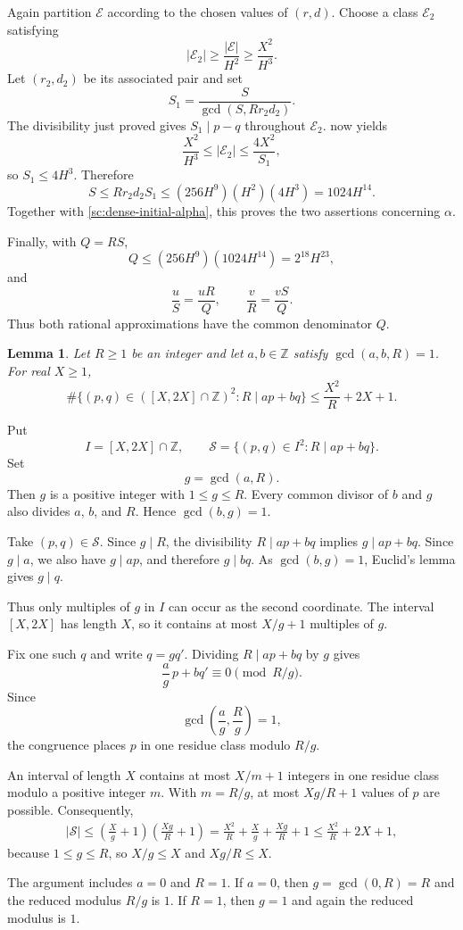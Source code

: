\documentclass[twoside]{aomart}
\makeatletter
\theoremstyle{paperplain}
\newtheorem{lemma}[theorem]{Lemma}
\theoremstyle{paperdefinition}
\renewenvironment{proof}[1][\proofname]{\par\pushQED{\qed}%
  \normalfont\topsep6\p@\@plus3\p@\relax\trivlist
  \item[\hskip\labelsep\itshape #1\@addpunct{.}]\ignorespaces
}{\popQED\endtrivlist\@endpefalse}
\numberwithin{equation}{section}
\makeatother
\begin{document}
\begin{proof}
Again partition $\mathcal E$ according to the chosen values of $(r,d)$.
Choose a class $\mathcal E_2$ satisfying
$$|\mathcal E_2|\ge\frac{|\mathcal E|}{H^2}\ge\frac{X^2}{H^3}.$$
Let $(r_2,d_2)$ be its associated pair and set
\[
 S_1=\frac{S}{\gcd(S,Rr_2d_2)}.
\]
The divisibility just proved gives
$S_1\mid p-q$ throughout $\mathcal E_2$.  now yields
\[
 \frac{X^2}{H^3}
 \le |\mathcal E_2|
 \le \frac{4X^2}{S_1},
\]
so $S_1\le4H^3$. Therefore
\[
 S\le Rr_2d_2S_1
 \le (256H^9)(H^2)(4H^3)
 =1024H^{14}.
\]
Together with \eqref{sc:dense-initial-alpha}, this proves the two
assertions concerning $\alpha$.

Finally, with $Q=RS$,
\[
 Q\le(256H^9)(1024H^{14})=2^{18}H^{23},
\]
and
\[
 \frac uS=\frac{uR}{Q},
 \qquad
 \frac vR=\frac{vS}{Q}.
\]
Thus both rational approximations have the common denominator $Q$.
\end{proof}

\begin{lemma}\label{sc:primitive-congruence}
Let $R\ge1$ be an integer and let $a,b\in\mathbb Z$ satisfy
$\gcd(a,b,R)=1$. For real $X\ge1$,
\begin{equation*}
 \#\{(p,q)\in([X,2X]\cap\mathbb Z)^2:R\mid ap+bq\}
 \le\frac{X^2}{R}+2X+1.
\end{equation*}
\end{lemma}

\begin{proof}
Put
\[
 I=[X,2X]\cap\mathbb Z,\qquad
 \mathcal S=\{(p,q)\in I^2:R\mid ap+bq\}.
\]
Set
\[
 g=\gcd(a,R).
\]
Then $g$ is a positive integer with $1\le g\le R$. Every common
divisor of $b$ and $g$ also divides $a$, $b$, and $R$. Hence
$\gcd(b,g)=1$.

Take $(p,q)\in\mathcal S$. Since $g\mid R$, the divisibility
$R\mid ap+bq$ implies $g\mid ap+bq$. Since $g\mid a$, we also have
$g\mid ap$, and therefore $g\mid bq$. As $\gcd(b,g)=1$, Euclid's
lemma gives $g\mid q$.

Thus only multiples of $g$ in $I$ can occur as the second coordinate.
The interval $[X,2X]$ has length $X$, so it contains at most
$X/g+1$ multiples of $g$.

Fix one such $q$ and write $q=gq'$. Dividing
$R\mid ap+bq$ by $g$ gives
\[
 \frac ag\,p+bq'\equiv0\pmod{R/g}.
\]
Since
\[
 \gcd\left(\frac ag,\frac Rg\right)=1,
\]
the congruence places $p$ in one residue class modulo $R/g$.

An interval of length $X$ contains at most $X/m+1$ integers in one
residue class modulo a positive integer $m$. With $m=R/g$, at most
$Xg/R+1$ values of $p$ are possible.
Consequently,
\begin{align*}
 |\mathcal S|
 \le\left(\frac Xg+1\right)
       \left(\frac{Xg}{R}+1\right)
 =\frac{X^2}{R}+\frac Xg+\frac{Xg}{R}+1
 \le\frac{X^2}{R}+2X+1,
\end{align*}
because $1\le g\le R$, so $X/g\le X$ and $Xg/R\le X$.

The argument includes $a=0$ and $R=1$. If $a=0$, then
$g=\gcd(0,R)=R$ and the reduced modulus $R/g$ is $1$. If $R=1$,
then $g=1$ and again the reduced modulus is $1$.
\end{proof}
\end{document}
